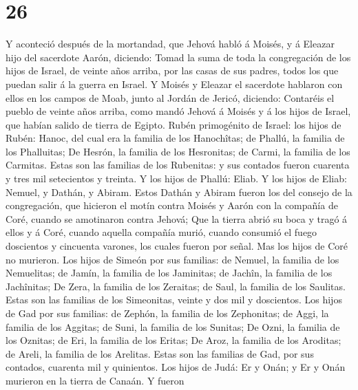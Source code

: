 \hypertarget{section-25}{%
\section{26}\label{section-25}}

 Y aconteció después de la mortandad, que Jehová habló á
Moisés, y á Eleazar hijo del sacerdote Aarón, diciendo: 
Tomad la suma de toda la congregación de los hijos de Israel, de veinte
años arriba, por las casas de sus padres, todos los que puedan salir á
la guerra en Israel.  Y Moisés y Eleazar el sacerdote
hablaron con ellos en los campos de Moab, junto al Jordán de Jericó,
diciendo:  Contaréis el pueblo de veinte años arriba, como
mandó Jehová á Moisés y á los hijos de Israel, que habían salido de
tierra de Egipto.  Rubén primogénito de Israel: los hijos
de Rubén: Hanoc, del cual era la familia de los Hanochîtas; de Phallú,
la familia de los Phalluitas;  De Hesrón, la familia de
los Hesronitas; de Carmi, la familia de los Carmitas. 
Estas son las familias de los Rubenitas: y sus contados fueron cuarenta
y tres mil setecientos y treinta.  Y los hijos de Phallú:
Eliab.  Y los hijos de Eliab: Nemuel, y Dathán, y Abiram.
Estos Dathán y Abiram fueron los del consejo de la congregación, que
hicieron el motín contra Moisés y Aarón con la compañía de Coré, cuando
se amotinaron contra Jehová;  Que la tierra abrió su boca
y tragó á ellos y á Coré, cuando aquella compañía murió, cuando consumió
el fuego doscientos y cincuenta varones, los cuales fueron por señal.
 Mas los hijos de Coré no murieron.  Los
hijos de Simeón por sus familias: de Nemuel, la familia de los
Nemuelitas; de Jamín, la familia de los Jaminitas; de Jachîn, la familia
de los Jachînitas;  De Zera, la familia de los Zeraitas;
de Saul, la familia de los Saulitas.  Estas son las
familias de los Simeonitas, veinte y dos mil y doscientos.
 Los hijos de Gad por sus familias: de Zephón, la familia
de los Zephonitas; de Aggi, la familia de los Aggitas; de Suni, la
familia de los Sunitas;  De Ozni, la familia de los
Oznitas; de Eri, la familia de los Eritas;  De Aroz, la
familia de los Aroditas; de Areli, la familia de los Arelitas.
 Estas son las familias de Gad, por sus contados,
cuarenta mil y quinientos.  Los hijos de Judá: Er y Onán;
y Er y Onán murieron en la tierra de Canaán.  Y fueron
